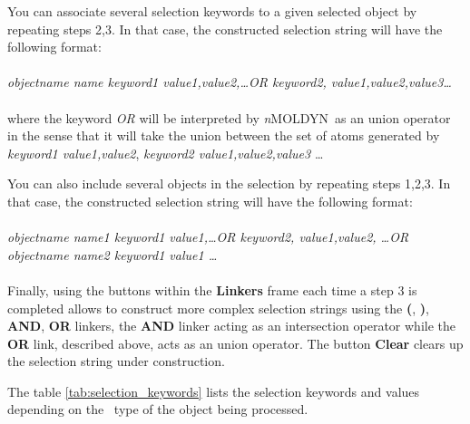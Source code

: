 \documentclass[a4paper,11pt]{report}
\newcommand{\NMOLDYN}{\textit{n}MOLDYN}
\begin{document}
You can associate several selection keywords to a given selected object by repeating steps 2,3. In that case, 
the constructed selection string will have the following format:
\\\\
\textit{objectname name keyword1 value1,value2,\ldots OR keyword2, value1,value2,value3\ldots}
\\\\
where the keyword \textit{OR} will be interpreted by \NMOLDYN\ as an union operator in the sense that it will take the 
union between the set of atoms generated by \textit{keyword1 value1,value2}, \textit{keyword2 value1,value2,value3} \ldots

You can also include several objects in the selection by repeating steps 1,2,3. In that case, the constructed selection 
string will have the following format:
\\\\
\textit{objectname name1 keyword1 value1,\ldots OR keyword2, value1,value2, \ldots OR objectname name2 keyword1 value1 \ldots}
\\\\
Finally, using the buttons within the \textbf{Linkers} frame each time a step 3 is completed allows to construct more complex selection strings using the 
\textbf{(}, \textbf{)}, \textbf{AND}, \textbf{OR} linkers, the \textbf{AND} linker acting as an intersection operator while the 
\textbf{OR} link, described above, acts as an union operator. The button \textbf{Clear} clears up the selection string under construction.

The table \ref{tab:selection_keywords} lists the selection keywords and values depending on the \MMTK\ type of the object being processed.
\end{document}
